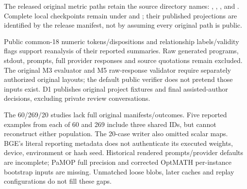 The released original metric paths retain the source directory names: , , ,  and . Complete local checkpoints remain under  and ; their published projections are identified by the release manifest, not by assuming every original path is public.

Public common-18 numeric tokens/dispositions and relationship labels/validity flags support reanalysis of their reported summaries. Raw generated programs, stdout, prompts, full provider responses and source quotations remain excluded. The original M3 evaluator  and M5 raw-response validator  require separately authorized original layouts; the default public verifier does not pretend those inputs exist. D1 publishes original project fixtures and final assisted-author decisions, excluding private review conversations.

The 60/269/20 studies lack full original manifests/outcomes. Five reported examples from each of 60 and 269 include three shared IDs, but cannot reconstruct either population. The 20-case writer also omitted scalar maps. BGE's literal reporting metadata does not authenticate its executed weights, device, environment or hash seed. Historical rendered prompts/provider defaults are incomplete; PaMOP full precision and corrected OptMATH per-instance bootstrap inputs are missing. Unmatched loose blobs, later caches and replay configurations do not fill these gaps.


